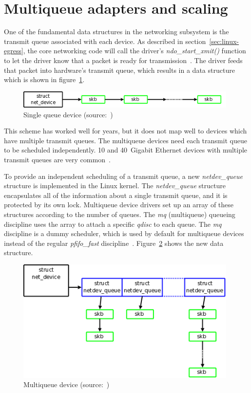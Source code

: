 
\section{Multiqueue adapters and scaling}\label{sec:linux-scaling}
One of the fundamental data structures in the networking subsystem is the transmit queue associated with each device.
As described in section~\ref{sec:linux-egress}, the core networking code will call the driver's {\it{ndo\_start\_xmit()}}
function to let the driver know that a packet is ready for transmission~\cite{mq-networking}.
The driver feeds that packet into hardware's transmit queue,
which results in a data structure which is shown in figure~\ref{fig:linux-queue-old}.
\begin{figure}
	\centering
	\includegraphics[width=11cm,keepaspectratio]{fig/net-queue-old.png}
	\caption{Single queue device (source:~\cite{mq-networking})}
	\label{fig:linux-queue-old}
\end{figure}

This scheme has worked well for years, but it does not map well to devices which have multiple transmit queues.
The multiqueue devices need each transmit queue to be scheduled independently.
10 and 40~Gigabit Ethernet devices with multiple transmit queues are very common~\cite{mq-networking}.

To provide an independent scheduling of a transmit queue,
a new {\it{netdev\_queue}} structure is implemented in the Linux kernel.
The {\it{netdev\_queue}} structure encapsulates all of the information about a single transmit queue,
and it is protected by its own lock.
Multiqueue device drivers set up an array of these structures according to the number of queues.
The {\it{mq}} (multiqueue) queueing  discipline uses the array to attach a specific {\it{qdisc}} to each queue.
The {\it{mq}} discipline is a dummy scheduler, which is used by default
for multiqueue devices instead of the regular {\it{pfifo\_fast}} discipline~\cite{kernel-doc-multiqueue}.
Figure~\ref{fig:linux-queue-mq} shows the new data structure.
\begin{figure}
	\centering
	\includegraphics[width=11cm,keepaspectratio]{fig/net-queue-mq.png}
	\caption{Multiqueue device (source:~\cite{mq-networking})}
	\label{fig:linux-queue-mq}
\end{figure}

